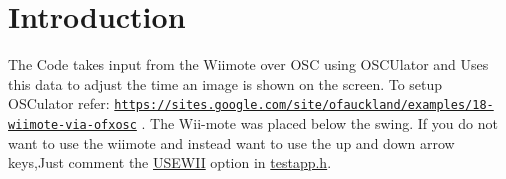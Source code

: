 \hypertarget{index_Introduction}{}\section{Introduction}\label{index_Introduction}
The Code takes input from the Wiimote over O\-S\-C using O\-S\-C\-Ulator and Uses this data to adjust the time an image is shown on the screen. To setup O\-S\-Culator refer\-: \href{https://sites.google.com/site/ofauckland/examples/18-wiimote-via-ofxosc}{\tt https\-://sites.\-google.\-com/site/ofauckland/examples/18-\/wiimote-\/via-\/ofxosc} . The Wii-\/mote was placed below the swing. If you do not want to use the wiimote and instead want to use the up and down arrow keys,Just comment the \hyperlink{}{U\-S\-E\-W\-I\-I} option in \hyperlink{test_app_8h}{testapp.\-h}. 